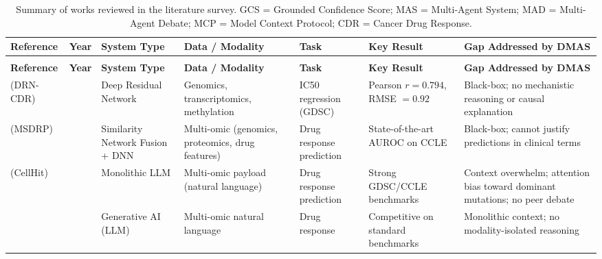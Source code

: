 \documentclass{article}
\begin{document}
\begingroup
\footnotesize
\setlength{\tabcolsep}{4pt}
\renewcommand{\arraystretch}{1.25}
\begin{longtable}{%
  >{\raggedright\arraybackslash}p{2.8cm}
  >{\centering\arraybackslash}p{0.6cm}
  >{\raggedright\arraybackslash}p{2.4cm}
  >{\raggedright\arraybackslash}p{2.5cm}
  >{\raggedright\arraybackslash}p{2.2cm}
  >{\raggedright\arraybackslash}p{2.2cm}
  >{\raggedright\arraybackslash}p{3.0cm}}

\caption{Summary of works reviewed in the literature survey. GCS = Grounded Confidence Score; MAS = Multi-Agent System; MAD = Multi-Agent Debate; MCP = Model Context Protocol; CDR = Cancer Drug Response.}
\label{tab:lit-summary} \\

\toprule
\textbf{Reference} &
\textbf{Year} &
\textbf{System Type} &
\textbf{Data / Modality} &
\textbf{Task} &
\textbf{Key Result} &
\textbf{Gap Addressed by DMAS} \\
\midrule
\endfirsthead

\multicolumn{7}{c}{\textit{(Table~\ref{tab:lit-summary} continued)}} \\
\toprule
\textbf{Reference} &
\textbf{Year} &
\textbf{System Type} &
\textbf{Data / Modality} &
\textbf{Task} &
\textbf{Key Result} &
\textbf{Gap Addressed by DMAS} \\
\midrule
\endhead

\bottomrule
\endlastfoot

\cite{saranya2024drn} (DRN-CDR) &
2024 &
Deep Residual Network &
Genomics, transcriptomics, methylation &
IC50 regression (GDSC) &
Pearson $r=0.794$, RMSE $=0.92$ &
Black-box; no mechanistic reasoning or causal explanation \\

\cite{zhao2023msdrp} (MSDRP) &
2023 &
Similarity Network Fusion + DNN &
Multi-omic (genomics, proteomics, drug features) &
Drug response prediction &
State-of-the-art AUROC on CCLE &
Black-box; cannot justify predictions in clinical terms \\

\cite{parca2025cellhit} (CellHit) &
2025 &
Monolithic LLM &
Multi-omic payload (natural language) &
Drug response prediction &
Strong GDSC/CCLE benchmarks &
Context overwhelm; attention bias toward dominant mutations; no peer debate \\

\cite{carli2025learning} &
2025 &
Generative AI (LLM) &
Multi-omic natural language &
Drug response &
Competitive on standard benchmarks &
Monolithic context; no modality-isolated reasoning \\


\end{longtable}
\end{document}
